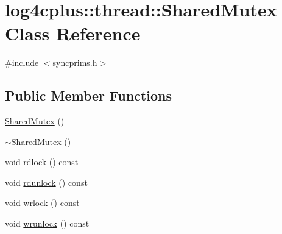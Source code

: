 \hypertarget{classlog4cplus_1_1thread_1_1SharedMutex}{\section{log4cplus\-:\-:thread\-:\-:Shared\-Mutex Class Reference}
\label{classlog4cplus_1_1thread_1_1SharedMutex}
}


{\ttfamily \#include $<$syncprims.\-h$>$}

\subsection*{Public Member Functions}
\begin{DoxyCompactItemize}
\item 
\hyperlink{classlog4cplus_1_1thread_1_1SharedMutex_aa809459c6eff20f2c86da7d121b7f2ce}{Shared\-Mutex} ()
\item 
\hyperlink{classlog4cplus_1_1thread_1_1SharedMutex_a8155f99290626a1a1c7282e368c8726d}{$\sim$\-Shared\-Mutex} ()
\item 
void \hyperlink{classlog4cplus_1_1thread_1_1SharedMutex_acd11f6dbc4d91679655bce921922de85}{rdlock} () const 
\item 
void \hyperlink{classlog4cplus_1_1thread_1_1SharedMutex_a82b134de3a73165f448fcb8b4ffb464d}{rdunlock} () const 
\item 
void \hyperlink{classlog4cplus_1_1thread_1_1SharedMutex_a02ee0f845373d648e8b329b557291f92}{wrlock} () const 
\item 
void \hyperlink{classlog4cplus_1_1thread_1_1SharedMutex_ac0355fe97fdd3dfd89d5716f3326fce7}{wrunlock} () const 
\end{DoxyCompactItemize}


